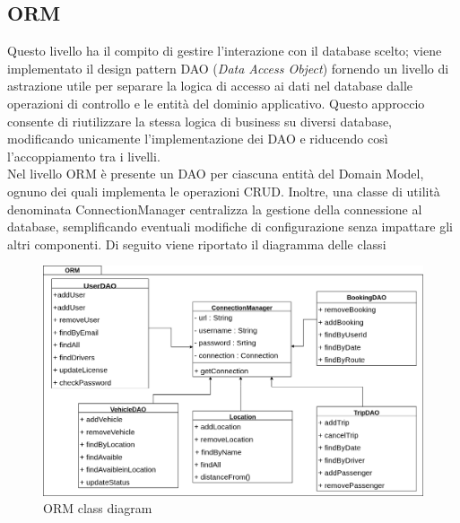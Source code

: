 \subsection{ORM}\label{subsec:ORM}
Questo livello ha il compito di gestire l'interazione con il database scelto; viene implementato il design pattern DAO (\textit{Data Access Object}) fornendo un livello di astrazione utile per separare la logica di accesso ai dati nel database dalle operazioni di controllo e le entità del dominio applicativo.
Questo approccio consente di riutilizzare la stessa logica di business su diversi database, modificando unicamente l’implementazione dei DAO e riducendo così l’accoppiamento tra i livelli.\\
Nel livello ORM è presente un DAO per ciascuna entità del Domain Model, ognuno dei quali implementa le operazioni CRUD. Inoltre, una classe di utilità denominata ConnectionManager centralizza la gestione della connessione al database, semplificando eventuali modifiche di configurazione senza impattare gli altri componenti.
Di seguito viene riportato il diagramma delle classi
\begin{figure}[H]
    \centering
    \includegraphics[width=1\linewidth]{Images/ORM_diag.png}
    \caption{ORM class diagram}
    \label{fig:ORMdiag}
\end{figure}

